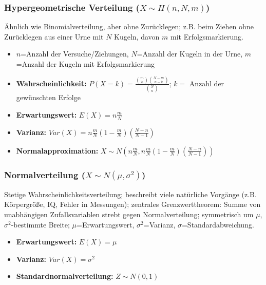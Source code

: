 \subsubsection{Hypergeometrische Verteilung (\(X\sim H(n,N,m)\))}

Ähnlich wie Binomialverteilung, aber ohne Zurücklegen; z.B. beim Ziehen ohne Zurücklegen aus einer Urne mit \(N\) Kugeln, davon \(m\) mit Erfolgsmarkierung.

\begin{itemize}
    \item \(n\)=Anzahl der Versuche/Ziehungen, \(N\)=Anzahl der Kugeln in der Urne, \(m\)=Anzahl der Kugeln mit Erfolgsmarkierung
    \item \textbf{Wahrscheinlichkeit:} \(P(X=k)=\frac{\binom{m}{k}\binom{N-m}{n-k}}{\binom{N}{n}}\); \(k=\) Anzahl der gewünschten Erfolge
    \item \textbf{Erwartungswert:} \(E(X)=n\frac{m}{N}\)
    \item \textbf{Varianz:} \(Var(X)=n\frac{m}{N}\left(1-\frac{m}{N}\right)\left(\frac{N-n}{N-1}\right)\)
    \item \textbf{Normalapproximation:} \(X\sim N\left(n\frac{m}{N}, n\frac{m}{N}\left(1-\frac{m}{N}\right)\left(\frac{N-n}{N-1}\right)\right)\)
\end{itemize}


\subsubsection{Normalverteilung (\(X\sim N(\mu, \sigma^2)\))}
Stetige Wahrscheinlichkeitsverteilung; beschreibt viele natürliche Vorgänge (z.B. Körpergröße, IQ, Fehler in Messungen); zentrales Grenzwerttheorem: Summe von unabhängigen Zufallsvariablen strebt gegen Normalverteilung; symmetrisch um \(\mu\), \(\sigma^2\)-bestimmte Breite; \(\mu\)=Erwartungswert, \(\sigma^2\)=Varianz, \(\sigma\)=Standardabweichung.

\begin{itemize}
    \item \textbf{Erwartungswert:} \(E(X)=\mu\)
    \item \textbf{Varianz:} \(Var(X)=\sigma^2\)
    \item \textbf{Standardnormalverteilung:} \(Z\sim N(0,1)\)
\end{itemize}